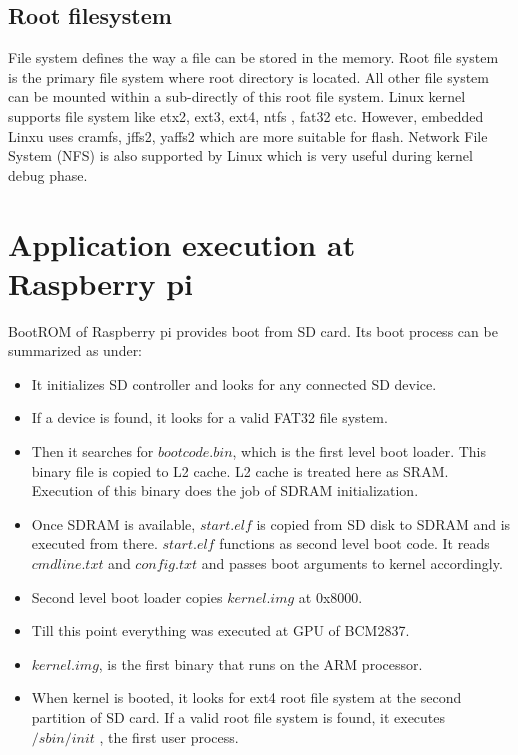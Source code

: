 \subsection {Root filesystem}
\indent	File system defines the way a file can be stored in the memory.
Root file system is the primary file system where root directory is
located. All other file system can be mounted within a sub-directly of
this root file system. Linux kernel supports file system like etx2,
ext3, ext4, ntfs , fat32 etc. However, embedded Linxu uses cramfs,
jffs2, yaffs2 which are more suitable for flash. Network File System
(NFS) is also supported by Linux which is very useful during kernel
debug phase.
\section {Application execution at Raspberry pi}
BootROM of Raspberry pi provides boot from SD card. Its boot process can
be summarized as under:
\begin{itemize}
	\item It initializes SD controller and looks for any connected
		SD device.
	\item If a device is found, it looks for a valid FAT32 file
		system.
	\item Then it searches for $bootcode.bin$, which is the first
		level boot loader. This binary file is copied to L2
		cache. L2 cache is treated here as SRAM. Execution of
		this binary does the job of SDRAM initialization.
	\item Once SDRAM is available, $start.elf$ is copied from SD
		disk to SDRAM and is executed from there. $start.elf$
		functions as second level boot code. It reads
		$cmdline.txt$ and $config.txt$ and passes boot arguments to
		kernel accordingly.
	\item Second level boot loader copies $kernel.img$ at 0x8000.
	\item Till this point everything was executed at GPU of BCM2837.
	\item $kernel.img$, is the first binary that runs on the ARM
		processor.
	\item When kernel is booted, it looks for ext4 root file system at
		the second partition of SD card. If a valid root file
		system is found, it executes $/sbin/init$ , the first user
		process.
\end{itemize}
